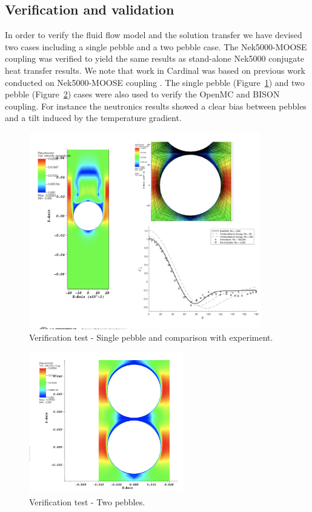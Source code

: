 \subsection{Verification and validation}
\label{ss:c3}

In order to verify the fluid flow model and the solution transfer we have devised two cases including a single pebble and a two pebble case. The Nek5000-MOOSE coupling was verified to yield the same results as stand-alone Nek5000 conjugate heat transfer results. We note that work in Cardinal was based on previous work conducted on Nek5000-MOOSE coupling \cite{novak2018preliminary}. The single pebble (Figure~\ref{f:pb1}) and two pebble (Figure~\ref{f:pb2}) cases were also used to verify the OpenMC and BISON coupling. For instance the neutronics results showed a clear bias between pebbles and a tilt induced by the temperature gradient.

\begin{figure}[!h]
\centering
\includegraphics[trim={0 0.5cm 0 0},clip=true,width=0.9\textwidth]{Figures/pb_vv1}
\caption{Verification test - Single pebble and comparison with experiment.}
\label{f:pb1}
\end{figure}

\begin{figure}[!h]
\centering
\includegraphics[clip=true,width=0.6\textwidth]{Figures/pb_vv2}
\caption{Verification test - Two pebbles.}
\label{f:pb2}
\end{figure}

